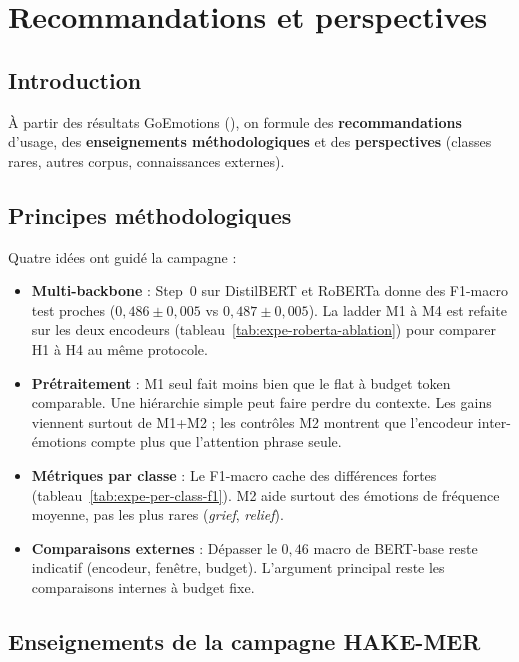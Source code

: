 \chapter{Recommandations et perspectives}

\section*{Introduction}
À partir des résultats GoEmotions (), on
formule des \textbf{recommandations} d'usage, des \textbf{enseignements
méthodologiques} et des \textbf{perspectives} (classes rares, autres
corpus, connaissances externes).

\section{Principes méthodologiques}
\label{sec:persp-enseignements}

Quatre idées ont guidé la campagne :
\begin{itemize}
\item \textbf{Multi-backbone} : Step~0 sur DistilBERT et RoBERTa donne
      des F1-macro test proches ($0{,}486 \pm 0{,}005$ vs
      $0{,}487 \pm 0{,}005$). La ladder M1 à M4 est refaite sur les deux
      encodeurs (tableau~\ref{tab:expe-roberta-ablation}) pour comparer
      H1 à H4 au même protocole.
\item \textbf{Prétraitement} : M1 seul fait moins bien que le flat à
      budget token comparable. Une hiérarchie simple peut faire perdre du
      contexte. Les gains viennent surtout de M1+M2 ; les contrôles M2
      montrent que l'encodeur inter-émotions compte plus que l'attention
      phrase seule.
\item \textbf{Métriques par classe} : Le F1-macro cache des différences
      fortes (tableau~\ref{tab:expe-per-class-f1}). M2 aide surtout des
      émotions de fréquence moyenne, pas les plus rares (\emph{grief},
      \emph{relief}).
\item \textbf{Comparaisons externes} : Dépasser le $0{,}46$ macro de
      BERT-base \cite{demszky2020} reste indicatif (encodeur, fenêtre,
      budget). L'argument principal reste les comparaisons internes à
      budget fixe.
\end{itemize}

\section{Enseignements de la campagne HAKE-MER}
\label{sec:persp-enseignements-campagne}

